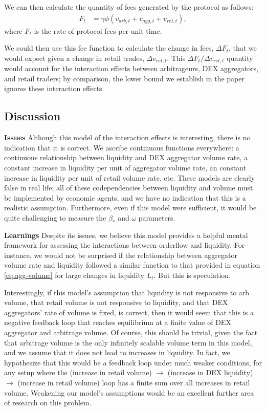     We can then calculate the quantity of fees generated by the protocol as follows:
        \begin{align}
            F_t & = \gamma \phi (v_{arb,t} + v_{agg,t} + v_{ret,t}),
        \end{align}
    where $F_t$ is the rate of protocol fees per unit time.

    We could then use this fee function to calculate the change in fees, $\Delta F_t$, that we would expect given a change in retail trades, $\Delta v_{ret,t}$. This $\Delta F_t / \Delta v_{ret,t}$ quantity would account for the interaction effects between arbitrageurs, DEX aggregators, and retail traders; by comparison, the lower bound we establish in the paper ignores these interaction effects.

    \subsection{Discussion}

    \textbf{Issues}
    Although this model of the interaction effects is interesting, there is no indication that it is correct. We ascribe continuous functions everywhere: a continuous relationship between liquidity and DEX aggregator volume rate, a constant increase in liquidity per unit of aggregator volume rate, an constant increase in liquidity per unit of retail volume rate, etc. These models are clearly false in real life; all of these codependencies between liquidity and volume must be implemented by economic agents, and we have no indication that this is a realistic assumption. Furthermore, even if this model were sufficient, it would be quite challenging to measure the $\beta_*$ and $\omega$ parameters.

    \textbf{Learnings}
    Despite its issues, we believe this model provides a helpful mental framework for assessing the interactions between orderflow and liquidity. For instance, we would not be surprised if the relationship between aggregator volume rate and liquidity followed a similar function to that provided in equation \ref{eq:agg-volume} for large changes in liquidity $L_t$. But this is speculation.

    Interestingly, if this model's assumption that liquidity is not responsive to arb volume, that retail volume is not responsive to liquidity, and that DEX aggregators' rate of volume is fixed, is correct, then it would seem that this is a negative feedback loop that reaches equilibrium at a finite value of DEX aggregator and arbitrage volume. Of course, this should be trivial, given the fact that arbitrage volume is the only infinitely scalable volume term in this model, and we assume that it does not lead to increases in liquidity. In fact, we hypothesize that this would be a feedback loop under much weaker conditions, for any setup where the (increase in retail volume) $\rightarrow$ (increase in DEX liquidity) $\rightarrow$ (increase in retail volume) loop has a finite sum over all increases in retail volume. Weakening our model's assumptions would be an excellent further area of research on this problem.        
    
    

    
